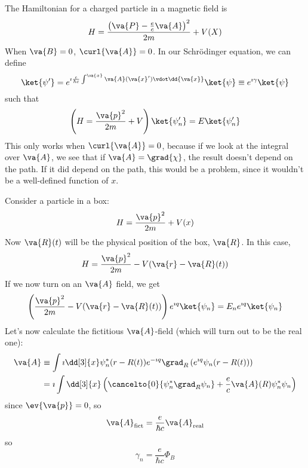 \documentclass[a4paper,twoside,master.tex]{subfiles}
\begin{document}
The Hamiltonian for a charged particle in a magnetic field is
\begin{equation}
    H = \frac{\left( \va{P} - \frac{e}{c} \va{A} \right)^2}{2m} + V(X)
\end{equation}
When $ \va{B} = 0 $, $ \curl{\va{A}} = 0 $. In our Schr\"odinger equation, we can define
\begin{equation}
    \ket{\psi'} = e^{\imath \frac{e}{\hbar c} \int^{\va{x}} \va{A}(\va{x} ') \vdot \dd{\va{x}}}\ket{\psi} \equiv e^{\imath \gamma}\ket{\psi}
\end{equation}
such that
\begin{equation}
    \left(H = \frac{\va{p}^2}{2m} + V\right)\ket{\psi'_n} = E\ket{\psi'_n} 
\end{equation}
This only works when $ \curl{\va{A}} = 0 $, because if we look at the integral over $ \va{A} $, we see that if $ \va{A} = \grad{\chi} $, the result doesn't depend on the path. If it did depend on the path, this would be a problem, since it wouldn't be a well-defined function of $ x $.


Consider a particle in a box:
\begin{equation}
    H = \frac{\va{p}^2}{2m} + V(x)
\end{equation}
Now $ \va{R}(t) $ will be the physical position of the box, $ \va{R} $. In this case,
\begin{equation}
    H = \frac{\va{p}^2}{2m} - V(\va{r} - \va{R}(t))
\end{equation}
If we now turn on an $ \va{A} $ field, we get
\begin{equation}
    \left( \frac{\va{p}^2}{2m} - V(\va{r} - \va{R}(t)) \right) e^{\imath q}\ket{\psi_n} = E_n e^{\imath q}\ket{\psi_n}
\end{equation}
Let's now calculate the fictitious $ \va{A} $-field (which will turn out to be the real one):
\begin{align}
    \va{A} &\equiv \int \imath \dd[3]{x} \psi^*_n(r-R(t)) e^{- \imath q} \grad_R \left( e^{\imath q} \psi_n(r-R(t)) \right) \\
    &= \imath \int \dd[3]{x} \left( \cancelto{0}{\psi_n^* \grad_R \psi_n} + \frac{e}{c} \va{A}(R) \psi^*_n \psi_n \right)
\end{align}
since $ \ev{\va{p}} = 0 $, so
\begin{equation}
    \va{A}_{\text{fict}} = \frac{e}{\hbar c} \va{A}_{\text{real}}
\end{equation}
so 
\begin{equation}
    \gamma_n = \frac{e}{\hbar c} \Phi_B
\end{equation}
\end{document}
